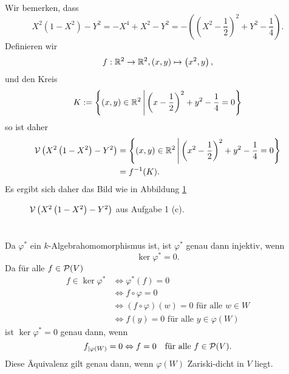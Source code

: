 \documentclass[a4paper,10pt]{article}
\begin{document}
\subsection{}
Wir bemerken, dass
\[
 X^2 \left( 1 - X^2 \right) - Y^2
 = -X^4 + X^2 - Y^2
 = -\left( \left(X^2 - \frac{1}{2} \right)^2 + Y^2 - \frac{1}{4} \right).
\]
Definieren wir
\[
 f : \mathbb{R}^2 \to \mathbb{R}^2, (x,y) \mapsto \left(x^2,y\right),
\]
und den Kreis
\[
 K := \left\{ (x,y) \in \mathbb{R}^2 \,\middle|\, \left(x - \frac{1}{2} \right)^2 + y^2 - \frac{1}{4} = 0 \right\}
\]
so ist daher
\begin{align*}
 \mathcal{V}\left( X^2 \left( 1 - X^2 \right) - Y^2 \right)
 &= \left\{ (x,y) \in \mathbb{R}^2 \,\middle|\, \left(x^2 - \frac{1}{2} \right)^2 + y^2 - \frac{1}{4} = 0 \right\} \\
 &= f^{-1}(K).
\end{align*}
Es ergibt sich daher das Bild wie in Abbildung \ref{fig: lemis carte}
\begin{figure}\centering
 \caption{$\mathcal{V}\left(X^2 \left( 1 - X^2 \right) - Y^2\right)$ aus Aufgabe 1 (c).}
 \label{fig: lemis carte}
\end{figure}





\section{}


\subsection{}
Da $\varphi^*$ ein $k$-Algebrahomomorphismus ist, ist $\varphi^*$ genau dann injektiv, wenn
\[
 \ker \varphi^* = 0.
\]
Da für alle $f \in \mathcal{P}(V)$
\begin{align*}
 f \in \ker \varphi^*
 &\Leftrightarrow \varphi^*(f) = 0 \\
 &\Leftrightarrow f \circ \varphi = 0 \\
 &\Leftrightarrow (f \circ \varphi)(w) = 0 \text{ für alle } w \in W \\
 &\Leftrightarrow f(y) = 0 \text{ für alle } y \in \varphi(W)
\end{align*}
ist $\ker \varphi^* = 0$ genau dann, wenn
\[
 f_{|\varphi(W)} = 0 \Leftrightarrow f = 0 \quad \text{für alle } f \in \mathcal{P}(V).
\]
Diese Äquivalenz gilt genau dann, wenn $\varphi(W)$ Zariski-dicht in $V$ liegt.
\end{document}
